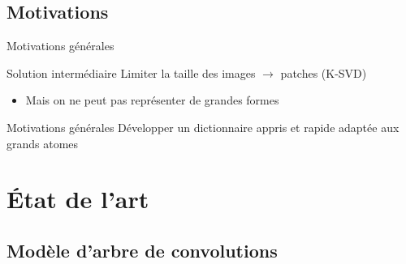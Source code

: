 \subsection{Motivations}
\begin{frame}{Motivations générales}
\begin{block}{Solution intermédiaire}
Limiter la taille des images $\rightarrow$ \alert{patches} (K-SVD)
\end{block}
\begin{itemize}
\item[\xmark] Mais on ne peut pas représenter de \alert{grandes formes}
\end{itemize}
\begin{figure}\centering
{}
\end{figure}
\begin{exampleblock}{Motivations générales}
Développer un dictionnaire \alert{appris} et \alert{rapide} adaptée aux grands atomes
\end{exampleblock}
\end{frame}







\section{État de l'art}


\subsection{Modèle d'arbre de convolutions}

